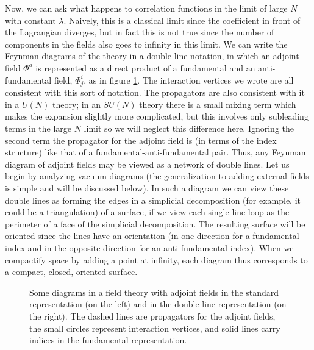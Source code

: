 Now, we can ask what happens to correlation functions in the limit of
large $N$ with constant $\lambda$. Naively, this is a classical limit
since the coefficient in front of the Lagrangian diverges, but in fact
this is not true since the number of components in the fields also
goes to infinity in this limit. We can write the Feynman diagrams of
the theory  in a double line notation, in which an
adjoint field $\Phi^a$ is represented as a direct product of a fundamental
and an anti-fundamental field, $\Phi^i_j$, as in figure \ref{thooft}.
The interaction vertices we wrote are all consistent with this sort of
notation. The propagators are also consistent with it in a $U(N)$ 
theory; in an $SU(N)$ theory there is a small mixing term
which makes the expansion slightly more complicated, but this involves
only subleading terms in the large $N$ limit so we will neglect this
difference here. Ignoring the second term the propagator for the
adjoint field is (in terms of the index structure) like that of a
fundamental-anti-fundamental pair.  Thus, any Feynman diagram of
adjoint fields may be viewed as a network of double lines. Let us
begin by analyzing vacuum diagrams (the generalization to adding
external fields is simple and will be discussed below). In such a
diagram we can view these double lines as forming the edges in a
simplicial decomposition (for example, it could be a triangulation)
of a surface, if we view each single-line loop
as the perimeter of a face of the simplicial decomposition. 
The resulting
surface will be oriented since the lines have an orientation (in one
direction for a fundamental index and in the opposite direction for an
anti-fundamental index). When we compactify space by adding a point at
infinity, each diagram thus corresponds to a compact, closed, oriented
surface.

\begin{figure}[htb]
\begin{center}
\epsfxsize=4in\leavevmode{}
\end{center}
\caption{Some diagrams in a field theory with adjoint fields in the
standard representation (on the left) and in the double line
representation (on the right). The dashed lines are propagators for
the adjoint fields, the small circles represent interaction vertices,
and  solid lines carry indices in the fundamental
representation.}
\label{thooft}
\end{figure}

